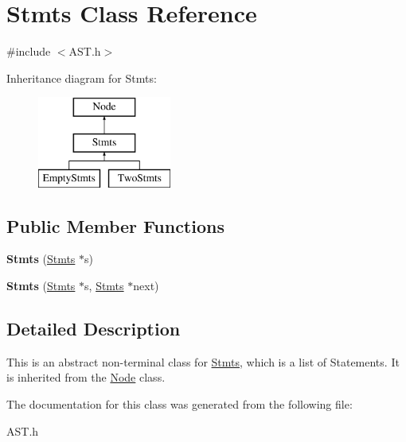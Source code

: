 \hypertarget{class_stmts}{}\section{Stmts Class Reference}
\label{class_stmts}


{\ttfamily \#include $<$A\+S\+T.\+h$>$}

Inheritance diagram for Stmts\+:\begin{figure}[H]
\begin{center}
\leavevmode
\includegraphics[height=3.000000cm]{class_stmts}
\end{center}
\end{figure}
\subsection*{Public Member Functions}
\begin{DoxyCompactItemize}
\item 
\hypertarget{class_stmts_aba699cd7379c215d669549f3724619b7}{}{\bfseries Stmts} (\hyperlink{class_stmts}{Stmts} $\ast$s)\label{class_stmts_aba699cd7379c215d669549f3724619b7}

\item 
\hypertarget{class_stmts_a446afc9a5260534961d3fe81b296cc33}{}{\bfseries Stmts} (\hyperlink{class_stmts}{Stmts} $\ast$s, \hyperlink{class_stmts}{Stmts} $\ast$next)\label{class_stmts_a446afc9a5260534961d3fe81b296cc33}

\end{DoxyCompactItemize}


\subsection{Detailed Description}
This is an abstract non-\/terminal class for \hyperlink{class_stmts}{Stmts}, which is a list of Statements. It is inherited from the \hyperlink{class_node}{Node} class. 

The documentation for this class was generated from the following file\+:\begin{DoxyCompactItemize}
\item 
A\+S\+T.\+h\end{DoxyCompactItemize}
